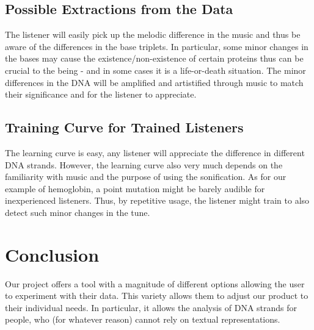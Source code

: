 \documentclass[10pt]{article}
\begin{document}
\subsection{Possible Extractions from the Data}
The listener will easily pick up the melodic difference in the music and thus be aware 
of the differences in the base triplets. In particular, some minor changes in the bases may 
cause the existence/non-existence of certain proteins thus can be crucial to the being - and in 
some cases it is a life-or-death situation. The minor differences in the DNA will be amplified 
and artistified through music to match their significance and for the listener to appreciate.
\subsection{Training Curve for Trained Listeners}
The learning curve is easy, any listener will appreciate the difference in different DNA 
strands. However, the learning curve also very much depends on the familiarity with music 
and the purpose of using the sonification. As for our example of hemoglobin, a point mutation 
might be barely audible for inexperienced listeners. Thus, by repetitive usage, the listener 
might train to also detect such minor changes in the tune.

\section{Conclusion}
Our project offers a tool with a magnitude of different options allowing the user to 
experiment with their data. This variety allows them to adjust our product to their individual 
needs. In particular, it allows the analysis of DNA strands for people, who (for whatever 
reason) cannot rely on textual representations.

\newpage
\clearpage
\pagestyle{empty}

\nocite{*}
\doublespacing
\printbibliography
\end{document}
